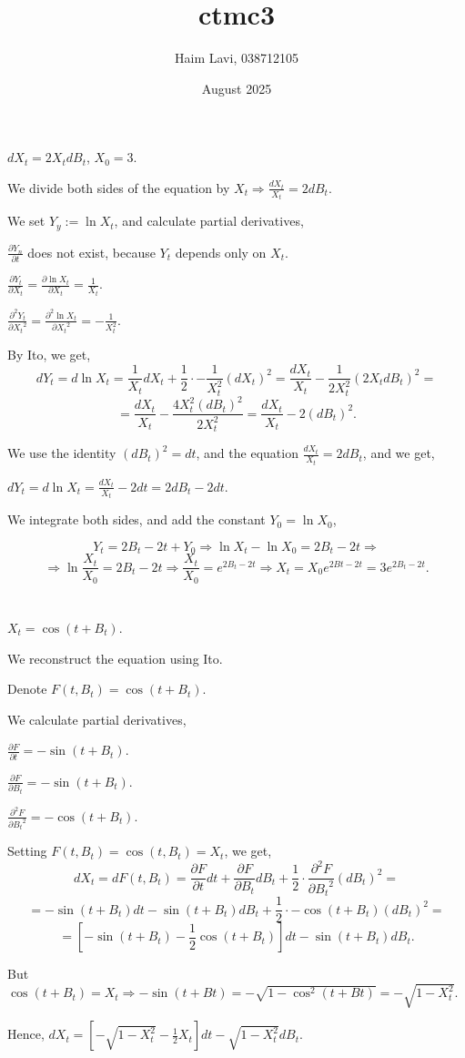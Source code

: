 \documentclass{article}
\title{ctmc3}
\author{Haim Lavi, 038712105}
\date{August 2025}
\begin{document}
\maketitle

\section{}
$dX_t=2X_tdB_t$, $X_0=3$.

We divide both sides of the equation by $X_t\Rightarrow\frac{dX_t}{X_t}=2dB_t$.

We set $Y_y:=\ln{X_t}$, and calculate partial derivatives,

$\frac{\partial{Y_n}}{\partial{t}}$ does not exist, because $Y_t$ depends only on $X_t$.

$\frac{\partial{Y_t}}{\partial{X_t}}=\frac{\partial\ln{X_t}}{\partial{X_t}}=\frac{1}{X_t}$.

$\frac{\partial^2{Y_t}}{\partial{X_t}^2}=\frac{\partial^2\ln{X_t}}{\partial{X_t}^2}=-\frac{1}{X_t^2}$.

\noindent
By Ito, we get,
\[dY_t=d\ln{X_t}=\frac{1}{X_t}dX_t+\frac{1}{2}\cdot-\frac{1}{X_t^2}(dX_t)^2=\frac{dX_t}{X_t}-\frac{1}{2X_t^2}(2X_tdB_t)^2=\]\[=\frac{dX_t}{X_t}-\frac{4X_t^2(dB_t)^2}{2X_t^2}=\frac{dX_t}{X_t}-2(dB_t)^2.\]

We use the identity $(dB_t)^2=dt$, and the equation $\frac{dX_t}{X_t}=2dB_t$, and we get,

$dY_t=d\ln{X_t}=\frac{dX_t}{X_t}-2dt=2dB_t-2dt$.

We integrate both sides, and add the constant $Y_0=\ln{X_0}$,

\[Y_t=2B_t-2t+Y_0\Rightarrow{\ln{X_t}-\ln{X_0}=2B_t-2t}\Rightarrow\]\[\Rightarrow\ln\frac{X_t}{X_0}=2B_t-2t\Rightarrow\frac{X_t}{X_0}=e^{2B_t-2t}\Rightarrow{X_t=X_0e^{2Bt-2t}}=3e^{2B_t-2t}.\]
\section{}
$X_t=\cos(t+B_t)$.

We reconstruct the equation using Ito.

Denote $F(t,B_t)=\cos(t+B_t)$.

We calculate partial derivatives,

$\frac{\partial{F}}{\partial{t}}=-\sin(t+B_t)$.

$\frac{\partial{F}}{\partial{B_t}}=-\sin(t+B_t)$.

$\frac{\partial^2{F}}{\partial{B_t}^2}=-\cos(t+B_t)$.

Setting $F(t,B_t)=\cos(t,B_t)=X_t$, we get,
\noindent
\[dX_t=dF(t,B_t)=\frac{\partial{F}}{\partial{t}}dt+\frac{\partial{F}}{\partial{B_t}}dB_t+\frac{1}{2}\cdot\frac{\partial^2{F}}{\partial{B_t}^2}(dB_t)^2=\]\[=-\sin(t+B_t)dt-\sin(t+B_t)dB_t+\frac{1}{2}\cdot-\cos(t+B_t)(dB_t)^2=\]\[=[-\sin(t+B_t)-\frac{1}{2}\cos(t+B_t)]dt-\sin(t+B_t)dB_t.\]

But $\cos(t+B_t)=X_t\Rightarrow{-\sin(t+Bt)=-\sqrt{1-\cos^2(t+Bt)}}=-\sqrt{1-X_t^2}$.

Hence, $dX_t=[-\sqrt{1-X_t^2}-\frac{1}{2}X_t]dt-\sqrt{1-X_t^2}dB_t$.
\section{}
\end{document}
